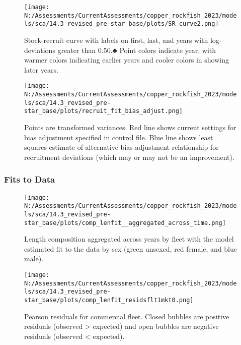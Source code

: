 \documentclass[11pt,
  english,
  letterpaper,
]{article}
\begin{document}
\pagebreak

\begin{figure}
\centering
\texttt{[image: N:/Assessments/CurrentAssessments/copper\_rockfish\_2023/models/sca/14.3\_revised\_pre-star\_base/plots/SR\_curve2.png]}
\caption{Stock-recruit curve with labels on first, last, and years with log-deviations greater than 0.50.♣ Point colors indicate year, with warmer colors indicating earlier years and cooler colors in showing later years.\label{fig:bh-curve}}
\end{figure}

\pagebreak

\begin{figure}
\centering
\texttt{[image: N:/Assessments/CurrentAssessments/copper\_rockfish\_2023/models/sca/14.3\_revised\_pre-star\_base/plots/recruit\_fit\_bias\_adjust.png]}
\caption{Points are transformed variances. Red line shows current settings for bias adjustment specified in control file. Blue line shows least squares estimate of alternative bias adjustment relationship for recruitment deviations (which may or may not be an improvement).\label{fig:bias-adjust}}
\end{figure}

\newpage

\hypertarget{fits-to-data}{%
\subsubsection{Fits to Data}\label{fits-to-data}}

\begin{figure}
\centering
\texttt{[image: N:/Assessments/CurrentAssessments/copper\_rockfish\_2023/models/sca/14.3\_revised\_pre-star\_base/plots/comp\_lenfit\_\_aggregated\_across\_time.png]}
\caption{Length composition aggregated across years by fleet with the model estimated fit to the data by sex (green unsexed, red female, and blue male).\label{fig:len-agg-fit}}
\end{figure}

\pagebreak

\begin{figure}
\centering
\texttt{[image: N:/Assessments/CurrentAssessments/copper\_rockfish\_2023/models/sca/14.3\_revised\_pre-star\_base/plots/comp\_lenfit\_residsflt1mkt0.png]}
\caption{Pearson residuals for commercial fleet. Closed bubbles are positive residuals (observed \textgreater{} expected) and open bubbles are negative residuals (observed \textless{} expected).\label{fig:com-dead-pearson}}
\end{figure}
\end{document}
